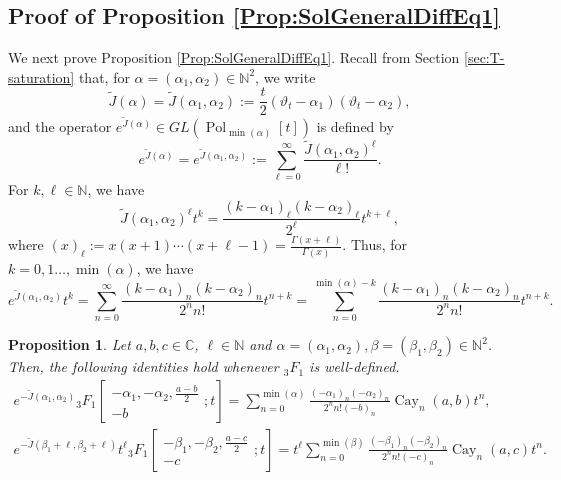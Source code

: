 \documentclass[a4paper,11pt,reqno]{amsart}
\newcommand{\NN}{\mathbb{N}}
\newcommand{\0}{{\bf 0}}
\newcommand{\N}{\mathbb{N}}
\newcommand{\C}{\mathbb{C}}
\newcommand{\1}{{\bf 1}}
\DeclareMathOperator{\Cay}{Cay}
\DeclareMathOperator{\Pol}{Pol}
\newcommand{\wJ}{\widetilde{J}}
\theoremstyle{plain}
\newtheorem{proposition}[equation]{Proposition}
\theoremstyle{definition}
\numberwithin{equation}{section}
\theoremstyle{definition}
\begin{document}
\begin{appendices}
\subsection{Proof of Proposition \texorpdfstring{\ref{Prop:SolGeneralDiffEq1}}{8.12}}
\label{appendix:CayleyCont3}

We next prove Proposition \ref{Prop:SolGeneralDiffEq1}.
Recall from Section \ref{sec:T-saturation} that,
for $\alpha=(\alpha_1,\alpha_2) \in \NN^2$, we write
\begin{equation}\label{eqn:Da2}
\wJ(\alpha)=
\wJ(\alpha_1, \alpha_2):=\frac{t}{2}(\vartheta_t-\alpha_1)(\vartheta_t-\alpha_2),
\end{equation}
and the operator
$e^{\wJ(\alpha)} \in GL(\Pol_{\min(\alpha)}[t])$ is defined by
\begin{equation*}
e^{\wJ(\alpha)}=
e^{\wJ(\alpha_1, \alpha_2)}
:=\sum_{\ell=0}^\infty \frac{\wJ(\alpha_1,\alpha_2)^\ell}{\ell!}.
\end{equation*}
For $k,\ell\in \N$, we have
\begin{equation}\label{eqn:wJtk}
\wJ(\alpha_1, \alpha_2)^\ell t^k 
=\frac{(k-\alpha_1)_\ell(k-\alpha_2)_\ell}{2^\ell}
t^{k+\ell},
\end{equation}
where $(x)_\ell:=x(x+1) \cdots (x+\ell-1) = \frac{\Gamma(x+\ell)}{\Gamma(x)}$.
Thus, for $k=0, 1\ldots, \min(\alpha)$, we have
\begin{equation}\label{eqn:eJk}
e^{\tilde{J}(\alpha_1, \alpha_2)}t^k
= \sum_{n=0}^{\infty}\frac{(k-\alpha_1)_n(k-\alpha_2)_n}{2^nn!}t^{n+k}
= \sum_{n=0}^{\min(\alpha)-k}\frac{(k-\alpha_1)_n(k-\alpha_2)_n}{2^nn!}t^{n+k}.
\end{equation}

\begin{proposition}\label{prop:Cayley_and_3F1_relation}
Let $a, b, c \in \C$, $\ell \in \N$ and $\alpha = (\alpha_1, \alpha_2), \beta = (\beta_1, \beta_2) \in \N^2$.
Then, the following identities hold whenever ${}_3F_1$ is 
well-defined.
\begin{align}\label{eq:Cayley_and_3F1_relation}
e^{-\wJ(\alpha_1, \alpha_2)}{}_3F_1\left[\begin{matrix}
    -\alpha_1, -\alpha_2, \frac{a-b}{2}\\
    -b
\end{matrix}; t\right] = \sum_{n=0}^{\min(\alpha)} \frac{(-\alpha_1)_n(-\alpha_2)_n}{2^n n! (-b)_n}\Cay_n(a,b)t^n,\\
\label{eq:Cayley_and_3F1_relation_2}
e^{-\wJ(\beta_1 + \ell, \beta_2 + \ell)}t^{\ell}{}_3F_1\left[\begin{matrix}
    -\beta_1, -\beta_2, \frac{a-c}{2}\\
    -c
\end{matrix}; t\right] = t^\ell \sum_{n=0}^{\min(\beta)} \frac{(-\beta_1)_n(-\beta_2)_n}{2^n n! (-c)_n}\Cay_n(a,c)t^n.
\end{align}
\end{proposition}


\end{appendices}
\end{document}
